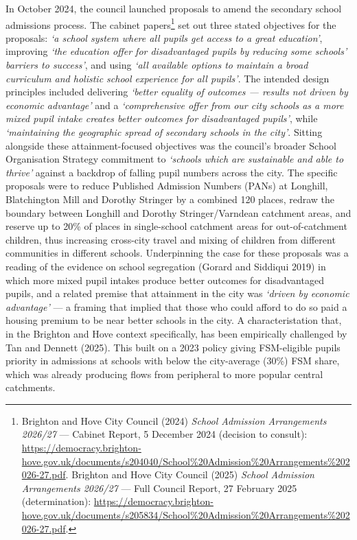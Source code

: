 \documentclass[
  12pt,
  titlepage]{article}
\begin{document}
In October 2024, the council launched proposals to amend the secondary
school admissions process. The cabinet papers\footnote{Brighton and Hove
  City Council (2024) \emph{School Admission Arrangements 2026/27} ---
  Cabinet Report, 5 December 2024 (decision to consult):
  \url{https://democracy.brighton-hove.gov.uk/documents/s204040/School\%20Admission\%20Arrangements\%202026-27.pdf}.
  Brighton and Hove City Council (2025) \emph{School Admission
  Arrangements 2026/27} --- Full Council Report, 27 February 2025
  (determination):
  \url{https://democracy.brighton-hove.gov.uk/documents/s205834/School\%20Admission\%20Arrangements\%202026-27.pdf}.}
set out three stated objectives for the proposals: \emph{`a school
system where all pupils get access to a great education'}, improving
\emph{`the education offer for disadvantaged pupils by reducing some
schools' barriers to success'}, and using \emph{`all available options
to maintain a broad curriculum and holistic school experience for all
pupils'}. The intended design principles included delivering
\emph{`better equality of outcomes --- results not driven by economic
advantage'} and a \emph{`comprehensive offer from our city schools as a
more mixed pupil intake creates better outcomes for disadvantaged
pupils'}, while \emph{`maintaining the geographic spread of secondary
schools in the city'}. Sitting alongside these attainment-focused
objectives was the council's broader School Organisation Strategy
commitment to \emph{`schools which are sustainable and able to thrive'}
against a backdrop of falling pupil numbers across the city. The
specific proposals were to reduce Published Admission Numbers (PANs) at
Longhill, Blatchington Mill and Dorothy Stringer by a combined 120
places, redraw the boundary between Longhill and Dorothy
Stringer/Varndean catchment areas, and reserve up to 20\% of places in
single-school catchment areas for out-of-catchment children, thus
increasing cross-city travel and mixing of children from different
communities in different schools. Underpinning the case for these
proposals was a reading of the evidence on school segregation (Gorard
and Siddiqui 2019) in which more mixed pupil intakes produce better
outcomes for disadvantaged pupils, and a related premise that attainment
in the city was \emph{`driven by economic advantage'} --- a framing that
implied that those who could afford to do so paid a housing premium to
be near better schools in the city. A characteristation that, in the
Brighton and Hove context specifically, has been empirically challenged
by Tan and Dennett (2025). This built on a 2023 policy giving
FSM-eligible pupils priority in admissions at schools with below the
city-average (30\%) FSM share, which was already producing flows from
peripheral to more popular central catchments.
\end{document}
